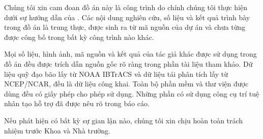 \begin{declaration}

Chúng tôi xin cam đoan đồ án này là công trình do chính chúng tôi thực hiện
dưới sự hướng dẫn của \dauGVHD. Các nội dung nghiên cứu, số liệu và kết quả
trình bày trong đồ án là trung thực, được sinh ra từ mã nguồn của dự án và
chưa từng được công bố trong bất kỳ công trình nào khác.

Mọi số liệu, hình ảnh, mã nguồn và kết quả của tác giả khác được sử dụng
trong đồ án đều được trích dẫn nguồn gốc rõ ràng trong phần tài liệu tham
khảo. Dữ liệu quỹ đạo bão lấy từ NOAA IBTrACS và dữ liệu tái phân tích lấy từ
NCEP/NCAR, đều là dữ liệu công khai. Toàn bộ phần mềm và thư viện được dùng
đều có giấy phép cho phép sử dụng. Những phần có sử dụng công cụ trí tuệ nhân
tạo hỗ trợ đã được nêu rõ trong báo cáo.

Nếu phát hiện có bất kỳ sự gian lận nào, chúng tôi xin chịu hoàn toàn trách
nhiệm trước Khoa và Nhà trường.

\vspace{1.4em}
\noindent{}\hfill
{}

\end{declaration}
